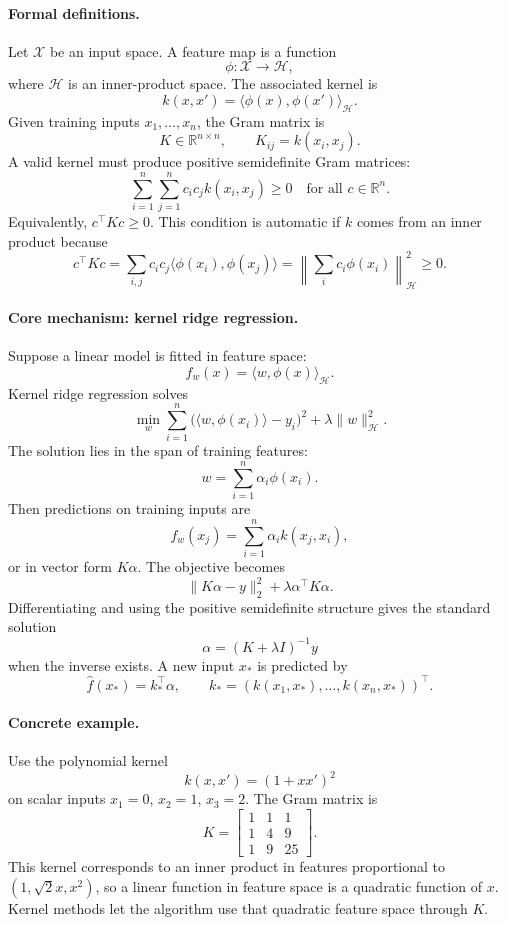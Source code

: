 \paragraph{Formal definitions.}
Let \(\mathcal X\) be an input space. A feature map is a function
\[
\phi:\mathcal X\to\mathcal H,
\]
where \(\mathcal H\) is an inner-product space. The associated kernel is
\[
\boxed{
k(x,x')=\langle \phi(x),\phi(x')\rangle_{\mathcal H}.
}
\]
Given training inputs \(x_1,\ldots,x_n\), the Gram matrix is
\[
K\in\mathbb R^{n\times n},
\qquad
K_{ij}=k(x_i,x_j).
\]
A valid kernel must produce positive semidefinite Gram matrices:
\[
\boxed{
\sum_{i=1}^n\sum_{j=1}^n c_i c_j k(x_i,x_j)\geq0
\quad\text{for all }c\in\mathbb R^n.
}
\]
Equivalently, \(c^\top Kc\geq0\). This condition is automatic if \(k\) comes from an inner product because
\[
c^\top Kc
=\sum_{i,j}c_i c_j\langle\phi(x_i),\phi(x_j)\rangle
=\left\|\sum_i c_i\phi(x_i)\right\|_{\mathcal H}^2\geq0.
\]

\paragraph{Core mechanism: kernel ridge regression.}
Suppose a linear model is fitted in feature space:
\[
f_w(x)=\langle w,\phi(x)\rangle_{\mathcal H}.
\]
Kernel ridge regression solves
\[
\min_w \sum_{i=1}^n \bigl(\langle w,\phi(x_i)\rangle-y_i\bigr)^2+\lambda\|w\|_{\mathcal H}^2.
\]
The solution lies in the span of training features:
\[
w=\sum_{i=1}^n \alpha_i\phi(x_i).
\]
Then predictions on training inputs are
\[
f_w(x_j)=\sum_{i=1}^n\alpha_i k(x_j,x_i),
\]
or in vector form \(K\alpha\). The objective becomes
\[
\|K\alpha-y\|_2^2+\lambda\alpha^\top K\alpha.
\]
Differentiating and using the positive semidefinite structure gives the standard solution
\[
\boxed{
\alpha=(K+\lambda I)^{-1}y
}
\]
when the inverse exists. A new input \(x_*\) is predicted by
\[
\boxed{
\widehat f(x_*)=k_*^\top\alpha,
\qquad
k_*=(k(x_1,x_*),\ldots,k(x_n,x_*))^\top.
}
\]

\paragraph{Concrete example.}
Use the polynomial kernel
\[
k(x,x')=(1+xx')^2
\]
on scalar inputs \(x_1=0\), \(x_2=1\), \(x_3=2\). The Gram matrix is
\[
K=
\begin{bmatrix}
1 & 1 & 1\\
1 & 4 & 9\\
1 & 9 & 25
\end{bmatrix}.
\]
This kernel corresponds to an inner product in features proportional to \((1,\sqrt2 x,x^2)\), so a linear function in feature space is a quadratic function of \(x\). Kernel methods let the algorithm use that quadratic feature space through \(K\).

